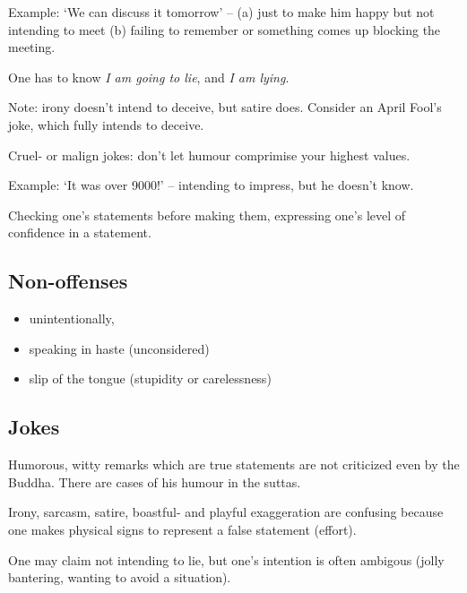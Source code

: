 Example: `We can discuss it tomorrow' -- (a) just to make him happy but
not intending to meet (b) failing to remember or something comes up
blocking the meeting.

One has to know \emph{I am going to lie}, and \emph{I am lying}.

Note: irony doesn't intend to deceive, but satire does. Consider an
April Fool's joke, which fully intends to deceive.

Cruel- or malign jokes: don't let humour comprimise your highest values.

Example: `It was over 9000!' -- intending to impress, but he doesn't
know.

Checking one's statements before making them, expressing one's level of
confidence in a statement.

%
%

\subsection{Non-offenses}

\begin{itemize}
\tightlist
\item
  unintentionally,
\item
  speaking in haste (unconsidered)
\item
  slip of the tongue (stupidity or carelessness)
\end{itemize}

\clearpage

\subsection{Jokes}

Humorous, witty remarks which are true statements are not criticized
even by the Buddha. There are cases of his humour in the suttas.

Irony, sarcasm, satire, boastful- and playful exaggeration are confusing
because one makes physical signs to represent a false statement
(effort).

One may claim not intending to lie, but one's intention is often
ambigous (jolly bantering, wanting to avoid a situation).

